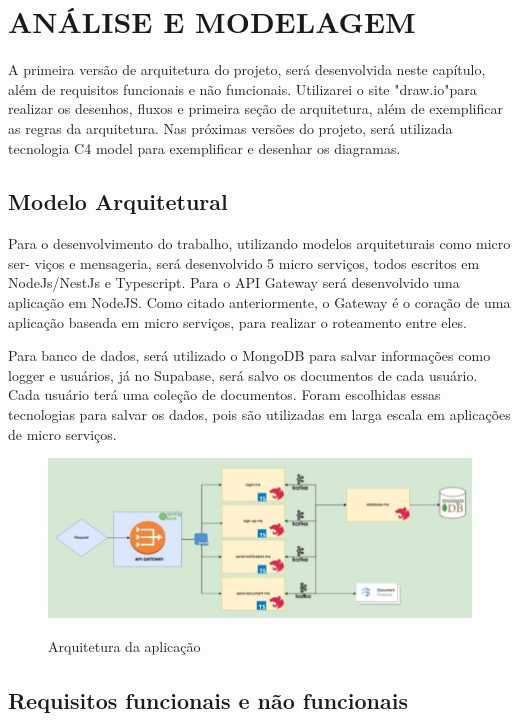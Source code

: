 \chapter{ANÁLISE E MODELAGEM}

A primeira versão de arquitetura do projeto, será desenvolvida neste capítulo, além de
requisitos funcionais e não funcionais. Utilizarei o site "draw.io"para realizar os desenhos, fluxos
e primeira seção de arquitetura, além de exemplificar as regras da arquitetura. Nas próximas
versões do projeto, será utilizada tecnologia C4 model para exemplificar e desenhar os diagramas.

\section{Modelo Arquitetural}
Para o desenvolvimento do trabalho, utilizando modelos arquiteturais como micro ser-
viços e mensageria, será desenvolvido 5 micro serviços, todos escritos em NodeJs/NestJs e
Typescript. Para o API Gateway será desenvolvido uma aplicação em NodeJS. Como citado
anteriormente, o Gateway é o coração de uma aplicação baseada em micro serviços, para realizar
o roteamento entre eles.

Para banco de dados, será utilizado o MongoDB para salvar informações como logger
e usuários, já no Supabase, será salvo os documentos de cada usuário. Cada usuário terá uma
coleção de documentos. Foram escolhidas essas tecnologias para salvar os dados, pois são
utilizadas em larga escala em aplicações de micro serviços.

\begin{figure}[!ht]
    \centering
    \caption{Arquitetura da aplicação}
    \includegraphics[scale=0.44]{assets/application-arch}
    \label{fig:application-arch}
    \tiny
    \sourcemedaddy
\end{figure}


\section{Requisitos funcionais e não funcionais}

